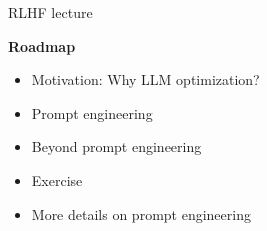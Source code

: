 \begin{vbframe}{RLHF lecture}

\vfill

\textbf{Roadmap}

	\begin{itemize}
		\item Motivation: Why LLM optimization?
		\item Prompt engineering
                \item Beyond prompt engineering
                  \item Exercise
                  \item More details on prompt engineering
	\end{itemize}

\vfill

\end{vbframe}
